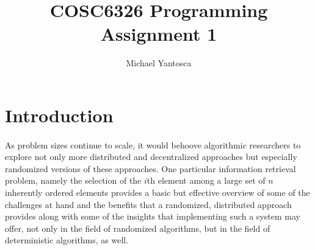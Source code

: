 \documentclass[11pt,epsf]{article}
\date{}
\title{COSC6326 Programming Assignment 1}
\author{Michael Yantosca}
\begin{document}
\maketitle
\tableofcontents

\section{Introduction}{
  \paragraph{}{
    As problem sizes continue to scale, it would behoove algorithmic researchers to explore
    not only more distributed and decentralized approaches but especially randomized versions
    of these approaches. One particular information retrieval problem, namely the selection
    of the $i$th element among a large set of $n$ inherently ordered elements provides a basic
    but effective overview of some of the challenges at hand and the benefits that a randomized,
    distributed approach provides along with some of the insights that implementing such a
    system may offer, not only in the field of randomized algorithms, but in the field of
    deterministic algorithms, as well.
  }
}
\end{document}
